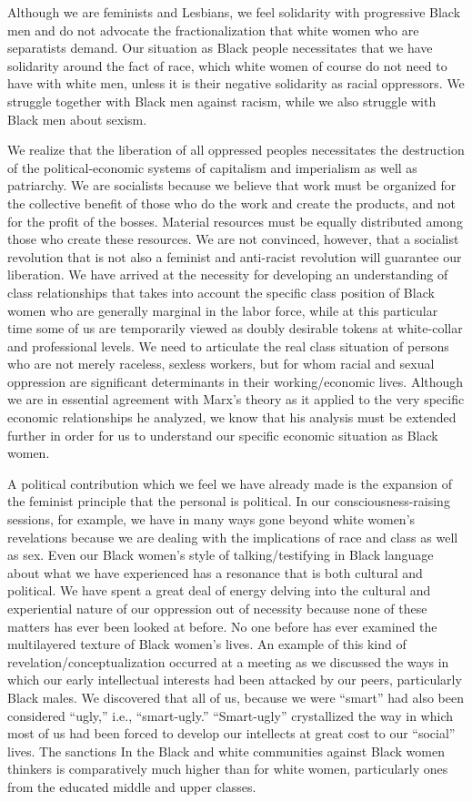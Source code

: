 \documentclass{article}
\begin{document}
Although we are feminists and Lesbians, we feel solidarity with progressive
Black men and do not advocate the fractionalization that white women who are
separatists demand. Our situation as Black people necessitates that we have
solidarity around the fact of race, which white women of course do not need to
have with white men, unless it is their negative solidarity as racial
oppressors. We struggle together with Black men against racism, while we also
struggle with Black men about sexism.

We realize that the liberation of all oppressed peoples necessitates the
destruction of the political-economic systems of capitalism and imperialism as
well as patriarchy. We are socialists because we believe that work must be
organized for the collective benefit of those who do the work and create the
products, and not for the profit of the bosses. Material resources must be
equally distributed among those who create these resources. We are not
convinced, however, that a socialist revolution that is not also a feminist and
anti-racist revolution will guarantee our liberation. We have arrived at the
necessity for developing an understanding of class relationships that takes
into account the specific class position of Black women who are generally
marginal in the labor force, while at this particular time some of us are
temporarily viewed as doubly desirable tokens at white-collar and professional
levels. We need to articulate the real class situation of persons who are not
merely raceless, sexless workers, but for whom racial and sexual oppression are
significant determinants in their working/economic lives. Although we are in
essential agreement with Marx's theory as it applied to the very specific
economic relationships he analyzed, we know that his analysis must be extended
further in order for us to understand our specific economic situation as Black
women.

A political contribution which we feel we have already made is the expansion of
the feminist principle that the personal is political. In our
consciousness-raising sessions, for example, we have in many ways gone beyond
white women's revelations because we are dealing with the implications of race
and class as well as sex. Even our Black women's style of talking/testifying in
Black language about what we have experienced has a resonance that is both
cultural and political. We have spent a great deal of energy delving into the
cultural and experiential nature of our oppression out of necessity because
none of these matters has ever been looked at before. No one before has ever
examined the multilayered texture of Black women's lives. An example of this
kind of revelation/conceptualization occurred at a meeting as we discussed the
ways in which our early intellectual interests had been attacked by our peers,
particularly Black males. We discovered that all of us, because we were
``smart'' had also been considered ``ugly,'' i.e., ``smart-ugly.''
``Smart-ugly'' crystallized the way in which most of us had been forced to
develop our intellects at great cost to our ``social'' lives. The sanctions In
the Black and white communities against Black women thinkers is comparatively
much higher than for white women, particularly ones from the educated middle
and upper classes.
\end{document}
